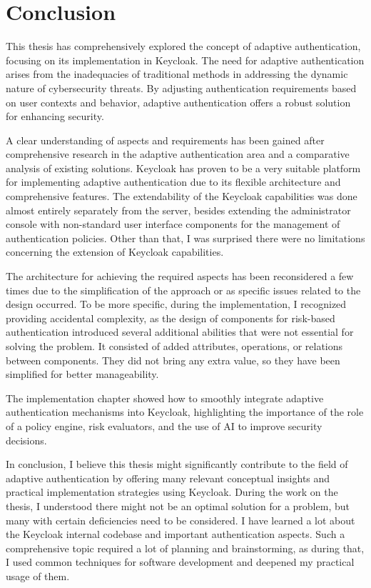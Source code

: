 \chapter{Conclusion} \label{conclusion}

This thesis has comprehensively explored the concept of adaptive authentication, focusing on its implementation in Keycloak.
The need for adaptive authentication arises from the inadequacies of traditional methods in addressing the dynamic nature of cybersecurity threats.
By adjusting authentication requirements based on user contexts and behavior, adaptive authentication offers a robust solution for enhancing security.

A clear understanding of aspects and requirements has been gained after comprehensive research in the adaptive authentication area and a comparative analysis of existing solutions.
Keycloak has proven to be a very suitable platform for implementing adaptive authentication due to its flexible architecture and comprehensive features.
The extendability of the Keycloak capabilities was done almost entirely separately from the server, besides extending the administrator console with non-standard user interface components for the management of authentication policies.
Other than that, I was surprised there were no limitations concerning the extension of Keycloak capabilities.

The architecture for achieving the required aspects has been reconsidered a few times due to the simplification of the approach or as specific issues related to the design occurred.
To be more specific, during the implementation, I recognized providing accidental complexity\cite{conclusion-accidental-complexity}, as the design of components for risk-based authentication introduced several additional abilities that were not essential for solving the problem.
It consisted of added attributes, operations, or relations between components.
They did not bring any extra value, so they have been simplified for better manageability.

The implementation chapter showed how to smoothly integrate adaptive authentication mechanisms into Keycloak, highlighting the importance of the role of a policy engine, risk evaluators, and the use of AI to improve security decisions. 

In conclusion, I believe this thesis might significantly contribute to the field of adaptive authentication by offering many relevant conceptual insights and practical implementation strategies using Keycloak.
During the work on the thesis, I understood there might not be an optimal solution for a problem, but many with certain deficiencies need to be considered.
I have learned a lot about the Keycloak internal codebase and important authentication aspects.
Such a comprehensive topic required a lot of planning and brainstorming, as during that, I used common techniques for software development and deepened my practical usage of them.

